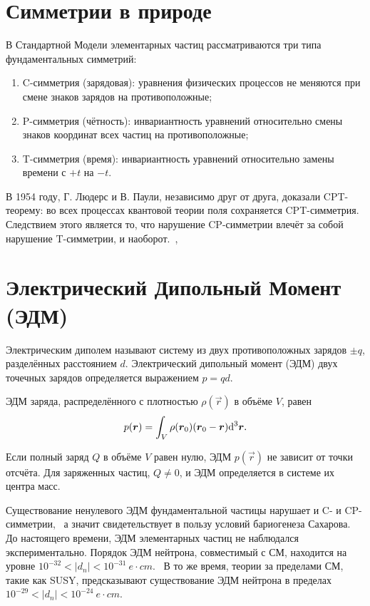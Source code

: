 \documentclass{report}
\begin{document}
\section{Симметрии в природе}
В Стандартной Модели элементарных частиц рассматриваются три типа фундаментальных симметрий:~\cite{Sozzi:Symmetries}
\begin{enumerate}
\item C-симметрия (зарядовая): уравнения физических процессов не меняются при смене знаков зарядов на противоположные;
\item P-симметрия (чётность): инвариантность уравнений относительно смены знаков координат всех частиц на противоположные;
\item T-симметрия (время): инвариантность уравнений относительно замены времени с $+t$ на $-t$.
\end{enumerate}

В 1954 году, Г. Людерс и В. Паули, независимо друг от друга, доказали CPT-теорему: во всех процессах квантовой теории поля сохраняется CPT-симметрия. Следствием этого является то, что нарушение CP-симметрии влечёт за собой нарушение T-симметрии, и наоборот.~\cite{Luders:CPT},~\cite{Pauli:CPT}


\section{Электрический Дипольный Момент (ЭДМ)}

Электрическим диполем называют систему из двух противоположных зарядов $\pm q$, разделённых расстоянием $d$. Электрический дипольный момент (ЭДМ) двух точечных зарядов определяется выражением $p = qd$.

ЭДМ заряда, распределённого с плотностью $\rho(\vec r)$ в объёме $V$, равен
\[
p(\boldsymbol r) = \int_V\rho(\boldsymbol r_0)(\boldsymbol r_0-\boldsymbol r)\mathrm{d}^3\boldsymbol r.
\]

Если полный заряд $Q$ в объёме $V$ равен нулю, ЭДМ $p(\vec r)$ не зависит от точки отсчёта. Для заряженных частиц, $Q\neq0$, и ЭДМ определяется в системе их центра масс.~\cite[стр.~2]{Eremey:Thesis}

Существование ненулевого ЭДМ фундаментальной частицы нарушает и C- и CP- симметрии,~\cite{Ramsey:EDM} а значит свидетельствует в пользу условий бариогенеза Сахарова. До настоящего времени, ЭДМ элементарных частиц не наблюдался экспериментально. Порядок ЭДМ нейтрона, совместимый с СМ, находится на уровне $10^{-32} < |d_n| < 10^{-31}~e\cdot cm$.~\cite{Khriplovich:EDM} В то же время, теории за пределами СМ, такие как SUSY, предсказывают существование ЭДМ нейтрона в пределах $10^{-29} < |d_n| < 10^{-24}~e\cdot cm$.~\cite{JEDI:Intro}
\end{document}
